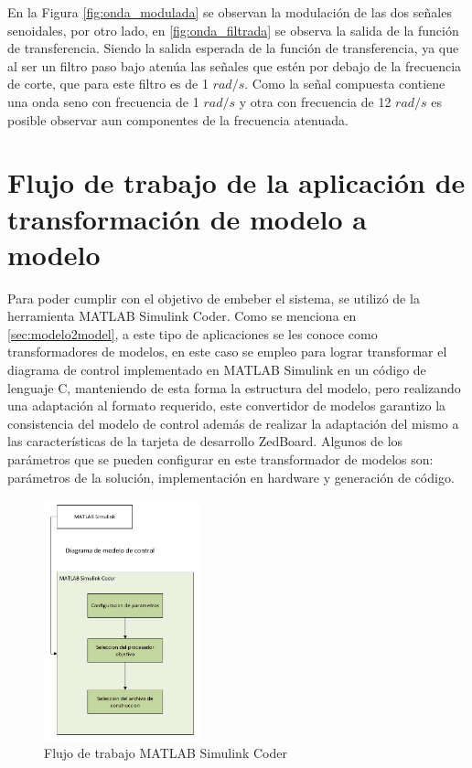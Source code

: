 En la Figura \ref{fig:onda_modulada} se observan la modulación de las dos señales senoidales, por otro lado, en \ref{fig:onda_filtrada} se observa la salida de la función de transferencia. Siendo la salida esperada de la función de transferencia, ya que al ser un filtro paso bajo atenúa las señales que estén por debajo de la frecuencia de corte, que para este filtro es de 1 $rad/s$. Como la señal compuesta contiene una onda seno con frecuencia de 1 $rad/s$ y otra con frecuencia de 12 $rad/s$ es posible observar aun componentes de la frecuencia atenuada.

\section{Flujo de trabajo de la aplicación de transformación de modelo a modelo}\label{sec:m2m_transformator}

Para poder cumplir con el objetivo de embeber el sistema, se utilizó de la herramienta MATLAB Simulink Coder. Como se menciona en \ref{sec:modelo2model}, a este tipo de aplicaciones se les conoce como transformadores de modelos, en este caso se empleo para lograr transformar el diagrama de control implementado en MATLAB Simulink en un código de lenguaje C, manteniendo de esta forma la estructura del modelo, pero realizando una adaptación al formato requerido, este convertidor de modelos garantizo la consistencia del modelo de control además de realizar la adaptación del mismo a las características de la tarjeta de desarrollo ZedBoard. Algunos de los parámetros que se pueden configurar en este transformador de modelos son: parámetros de la solución, implementación en hardware y generación de código.
\newpage

\begin{figure}[h!]
    \centering
    \includegraphics[width=0.4\textwidth]{fig/especifico_2/M2MT/model_2_model_diagram.pdf}
    \caption{Flujo de trabajo MATLAB Simulink Coder}
    \label{fig:m2m_matlab_simulink_coder}
\end{figure}

